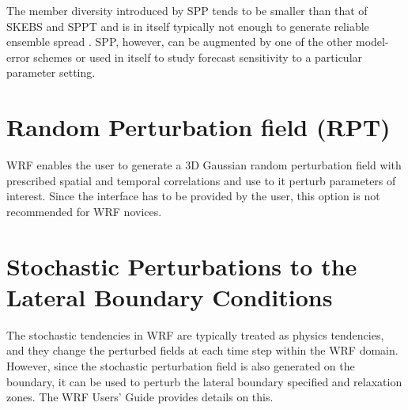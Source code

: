 The member diversity introduced by SPP tends to be smaller than that of SKEBS and SPPT 
and is in itself typically not enough to generate reliable ensemble spread 
\citep{Be15}.  SPP, however, can be augmented by one of the other model-error schemes 
or used in itself to study forecast sensitivity to a particular parameter setting.

\section {Random Perturbation field (RPT)}
WRF enables the user to generate a 3D Gaussian random perturbation field
with prescribed spatial and temporal correlations and use to it perturb
parameters of interest.  Since the interface has to be provided by the
user, this option is not recommended for WRF novices.

\section {Stochastic Perturbations to the Lateral Boundary Conditions}
The stochastic tendencies in WRF are typically treated as physics tendencies, and 
they change the perturbed fields at each time step within the WRF domain. However, since 
the stochastic perturbation field is also generated on the boundary, it can be used to 
perturb the lateral boundary specified and relaxation zones. The WRF Users' Guide 
provides details on this.

